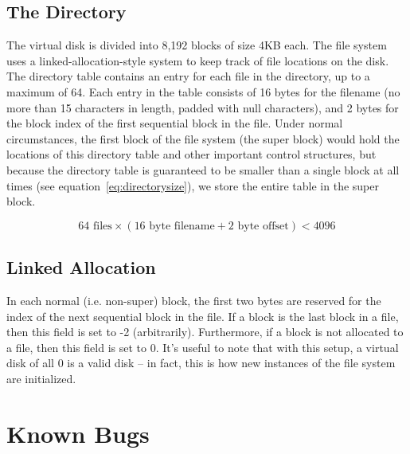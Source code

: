 \documentclass[paper=a4, fontsize=11pt]{scrartcl}
\begin{document}
\subsection*{The Directory}
The virtual disk is divided into 8,192 blocks of size 4KB each. The file system uses a linked-allocation-style system to keep track of file locations on the disk. The directory table contains an entry for each file in the directory, up to a maximum of 64. Each entry in the table consists of 16 bytes for the filename (no more than 15 characters in length, padded with null characters), and 2 bytes for the block index of the first sequential block in the file. Under normal circumstances, the first block of the file system (the super block) would hold the locations of this directory table and other important control structures, but because the directory table is guaranteed to be smaller than a single block at all times (see equation~\ref{eq:directorysize}), we store the entire table in the super block.

\begin{equation}
  \label{eq:directorysize}
  64 \textrm{ files} \times \left( 16 \textrm{ byte filename} + 2 \textrm{ byte offset} \right) < 4096
\end{equation}

\subsection*{Linked Allocation}
In each normal (i.e. non-super) block, the first two bytes are reserved for the index of the next sequential block in the file. If a block is the last block in a file, then this field is set to -2 (arbitrarily). Furthermore, if a block is not allocated to a file, then this field is set to 0. It's useful to note that with this setup, a virtual disk of all 0 is a valid disk -- in fact, this is how new instances of the file system are initialized.

\section*{Known Bugs}
\end{document}
